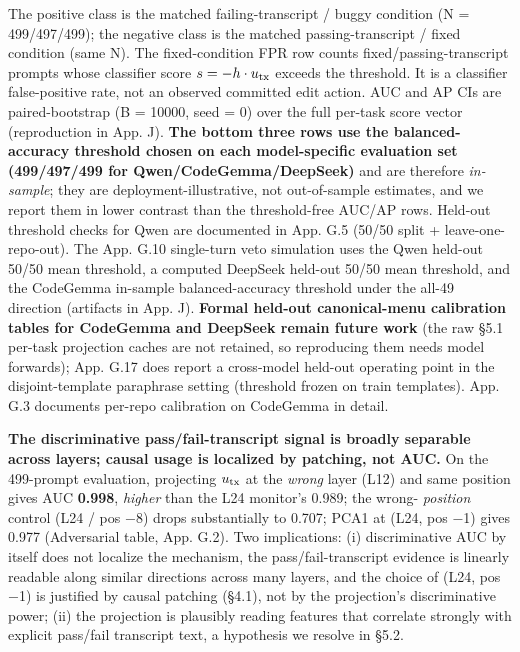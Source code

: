 \documentclass[
  11pt,
  a4paper]{article}
\begin{document}
The positive class is the matched failing-transcript / buggy condition
(N = 499/497/499); the negative class is the matched passing-transcript
/ fixed condition (same N). The fixed-condition FPR row counts
fixed/passing-transcript prompts whose classifier score
\(s=-h\cdot u_{\rm tx}\) exceeds the threshold. It is a classifier
false-positive rate, not an observed committed edit action. AUC and AP
CIs are paired-bootstrap (B = 10000, seed = 0) over the full per-task
score vector (reproduction in App. J). \textbf{The bottom three rows use
the balanced-accuracy threshold chosen on each model-specific evaluation
set (499/497/499 for Qwen/CodeGemma/DeepSeek)} and are therefore
\emph{in-sample}; they are deployment-illustrative, not out-of-sample
estimates, and we report them in lower contrast than the threshold-free
AUC/AP rows. Held-out threshold checks for Qwen are documented in App.
G.5 (50/50 split + leave-one-repo-out). The App. G.10 single-turn veto
simulation uses the Qwen held-out 50/50 mean threshold, a computed
DeepSeek held-out 50/50 mean threshold, and the CodeGemma in-sample
balanced-accuracy threshold under the all-49 direction (artifacts in
App. J). \textbf{Formal held-out canonical-menu calibration tables for
CodeGemma and DeepSeek remain future work} (the raw \S{}5.1 per-task
projection caches are not retained, so reproducing them needs model
forwards); App. G.17 does report a cross-model held-out operating point
in the disjoint-template paraphrase setting (threshold frozen on train
templates). App. G.3 documents per-repo calibration on CodeGemma in
detail.

\textbf{The discriminative pass/fail-transcript signal is broadly
separable across layers; causal usage is localized by patching, not
AUC.} On the 499-prompt evaluation, projecting \(u_{\rm tx}\) at the
\emph{wrong} layer (L12) and same position gives AUC \textbf{0.998},
\emph{higher} than the L24 monitor's 0.989; the wrong- \emph{position}
control (L24 / pos \ensuremath{-}8) drops substantially to 0.707; PCA1 at (L24, pos
\ensuremath{-}1) gives 0.977 (Adversarial table, App. G.2). Two implications: (i)
discriminative AUC by itself does not localize the mechanism, the
pass/fail-transcript evidence is linearly readable along similar
directions across many layers, and the choice of (L24, pos \ensuremath{-}1) is
justified by causal patching (\S{}4.1), not by the projection's
discriminative power; (ii) the projection is plausibly reading features
that correlate strongly with explicit pass/fail transcript text, a
hypothesis we resolve in \S{}5.2.
\end{document}
